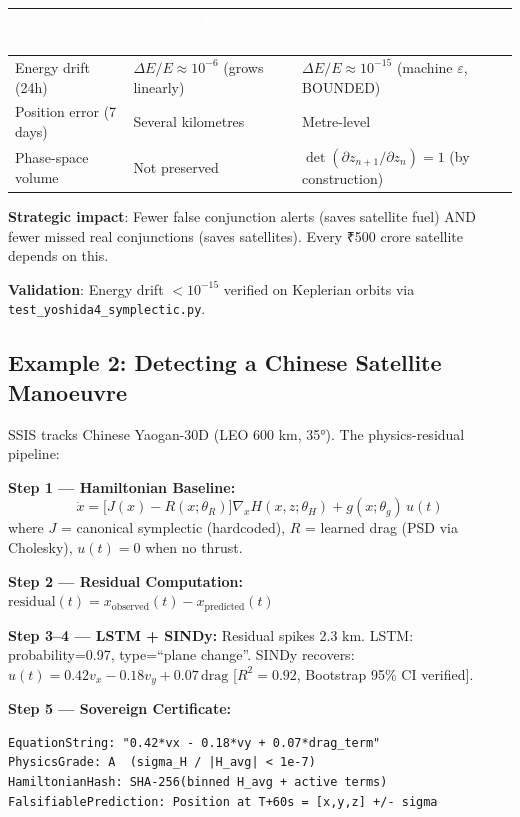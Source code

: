 \documentclass[11pt,a4paper]{article}
\newcommand{\TH}[1]{\textcolor{white}{\textbf{#1}}}
\begin{document}
\begin{table}[H]\centering\small
\begin{tabularx}{\textwidth}{|p{4cm}|X|X|}
\hline
\rowcolor{dblue}\TH{Property} & \TH{Standard RK4 (competitors)} & \TH{SSIS Yoshida-4 (symplectic)} \\
\hline
Energy drift (24h) & $\Delta E/E \approx 10^{-6}$ (grows linearly) & $\Delta E/E \approx 10^{-15}$ (machine $\varepsilon$, BOUNDED) \\
\hline
Position error (7 days) & Several kilometres & Metre-level \\
\hline
Phase-space volume & Not preserved & $\det(\partial z_{n+1}/\partial z_n)=1$ (by construction) \\
\hline
\end{tabularx}
\end{table}

\textbf{Strategic impact}: Fewer false conjunction alerts (saves satellite fuel) AND fewer missed real conjunctions (saves satellites). Every ₹500 crore satellite depends on this.

\textbf{Validation}: Energy drift $<10^{-15}$ verified on Keplerian orbits via \texttt{test\_yoshida4\_symplectic.py}.

\subsection{Example 2: Detecting a Chinese Satellite Manoeuvre}

SSIS tracks Chinese Yaogan-30D (LEO 600 km, 35°). The physics-residual pipeline:

\textbf{Step 1 --- Hamiltonian Baseline:}
\[
\dot{x} = \bigl[J(x) - R(x;\theta_R)\bigr]\nabla_x H(x,z;\theta_H) + g(x;\theta_g)\,u(t)
\]
where $J$ = canonical symplectic (hardcoded), $R$ = learned drag (PSD via Cholesky), $u(t)=0$ when no thrust.

\textbf{Step 2 --- Residual Computation:}
$\text{residual}(t) = x_{\text{observed}}(t) - x_{\text{predicted}}(t)$

\textbf{Step 3--4 --- LSTM + SINDy:} Residual spikes 2.3 km. LSTM: probability=0.97, type=``plane change''. SINDy recovers: $u(t)=0.42v_x - 0.18v_y + 0.07\,\text{drag}$ [$R^2=0.92$, Bootstrap 95\% CI verified].

\textbf{Step 5 --- Sovereign Certificate:}
\begin{lstlisting}[breaklines=true]
EquationString: "0.42*vx - 0.18*vy + 0.07*drag_term"
PhysicsGrade: A  (sigma_H / |H_avg| < 1e-7)
HamiltonianHash: SHA-256(binned H_avg + active terms)
FalsifiablePrediction: Position at T+60s = [x,y,z] +/- sigma
\end{lstlisting}
\end{document}
